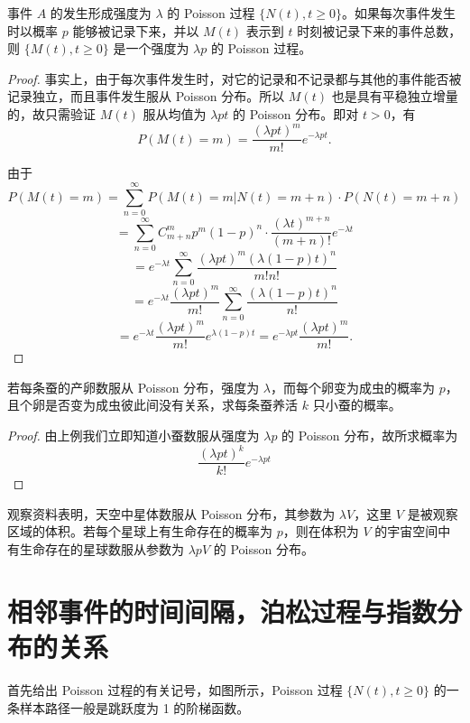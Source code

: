 \documentclass[lang=cn,10pt,thmcnt=section]{elegantbook}
\begin{document}
\begin{example}
	事件 $A$ 的发生形成强度为 $\lambda$ 的 Poisson 过程 $\{N(t), t \geq 0\}$。如果每次事件发生时以概率 $p$ 能够被记录下来，并以 $M(t)$ 表示到 $t$ 时刻被记录下来的事件总数，则 $\{M(t), t \geq 0\}$ 是一个强度为 $\lambda p$ 的 Poisson 过程。
\end{example}
\begin{proof}
	事实上，由于每次事件发生时，对它的记录和不记录都与其他的事件能否被记录独立，而且事件发生服从 Poisson 分布。所以 $M(t)$ 也是具有平稳独立增量的，故只需验证 $M(t)$ 服从均值为 $\lambda p t$ 的 Poisson 分布。即对 $t > 0$，有
\[
P(M(t) = m) = \frac{(\lambda p t)^m}{m!} e^{-\lambda p t}.
\]

由于
\[
P(M(t) = m) = \sum_{n=0}^{\infty} P(M(t) = m | N(t) = m + n) \cdot P(N(t) = m + n)
\]
\[
= \sum_{n=0}^{\infty} C_{m+n}^m p^m (1-p)^n \cdot \frac{(\lambda t)^{m+n}}{(m+n)!} e^{-\lambda t}
\]
\[
= e^{-\lambda t} \sum_{n=0}^{\infty} \frac{(\lambda p t)^m (\lambda (1-p) t)^n}{m! n!}
\]
\[
= e^{-\lambda t} \frac{(\lambda p t)^m}{m!} \sum_{n=0}^{\infty} \frac{(\lambda (1-p) t)^n}{n!}
\]
\[
= e^{-\lambda t} \frac{(\lambda p t)^m}{m!} e^{\lambda (1-p) t} = e^{-\lambda p t} \frac{(\lambda p t)^m}{m!}.
\]
\end{proof}

\begin{example}
	若每条蚕的产卵数服从 Poisson 分布，强度为 $\lambda$，而每个卵变为成虫的概率为 $p$，且个卵是否变为成虫彼此间没有关系，求每条蚕养活 $k$ 只小蚕的概率。

\end{example}
\begin{proof}
	由上例我们立即知道小蚕数服从强度为 $\lambda p$ 的 Poisson 分布，故所求概率为
\[
\frac{(\lambda p t)^k}{k!} e^{-\lambda p t}
\]
\end{proof}
\begin{example}
	观察资料表明，天空中星体数服从 Poisson 分布，其参数为 $\lambda V$，这里 $V$ 是被观察区域的体积。若每个星球上有生命存在的概率为 $p$，则在体积为 $V$ 的宇宙空间中有生命存在的星球数服从参数为 $\lambda p V$ 的 Poisson 分布。
\end{example}

\section{相邻事件的时间间隔，泊松过程与指数分布的关系}
首先给出 Poisson 过程的有关记号，如图所示，Poisson 过程 $\{N(t), t \geq 0\}$ 的一条样本路径一般是跳跃度为 1 的阶梯函数。
\end{document}
